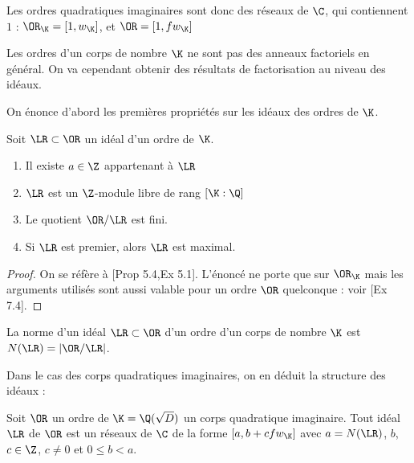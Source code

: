 \begin{Rem}
	Les ordres quadratiques imaginaires sont donc des réseaux de $\C$, qui contiennent $1$ : $\OR_{\K} = \left[1 , w_{\K}\right]$, et $\OR = \left[ 1, fw_{\K}\right]$
\end{Rem}

Les ordres d'un corps de nombre $\K$ ne sont pas des anneaux factoriels en général. On va cependant obtenir des résultats de factorisation au niveau des idéaux.

On énonce d'abord les premières propriétés sur les idéaux des ordres de $\K$.

\begin{Prop} Soit $\LR\subset\OR$ un idéal d'un ordre de $\K$.
	\begin{enumerate}
		\item Il existe $a\in\Z$ appartenant à $\LR$
		\item $\LR$ est un $\Z$-module libre de rang $\left[ \K : \Q\right] $
		\item Le quotient $\OR/\LR$ est fini.
		\item Si $\LR$ est premier, alors $\LR$ est maximal. 
	\end{enumerate}
\end{Prop}

\begin{proof}
	On se réfère à \cite{Cox}[Prop 5.4,Ex 5.1]. L'énoncé ne porte que sur $\OR_{\K}$ mais les arguments utilisés sont aussi valable pour un ordre $\OR$ quelconque : voir \cite{Cox}[Ex 7.4]. 
\end{proof}

\begin{Def}
	La norme d'un idéal $\LR\subset\OR$ d'un ordre d'un corps de nombre $\K$ est $N(\LR) = |\OR/\LR|$.
\end{Def}

Dans le cas des corps quadratiques imaginaires, on en déduit la structure des idéaux :

\begin{Coro}
	Soit $\OR$ un ordre de $\K = \Q(\sqrt{D})$ un corps quadratique imaginaire. Tout idéal $\LR$ de $\OR$ est un réseaux de $\C$ de la forme $\left[ a, b + cfw_{\K}\right]$ avec $a = N(\LR)$, $b$, $c\in\Z$, $c\neq 0$ et $0 \leq b< a$. 	
\end{Coro}

